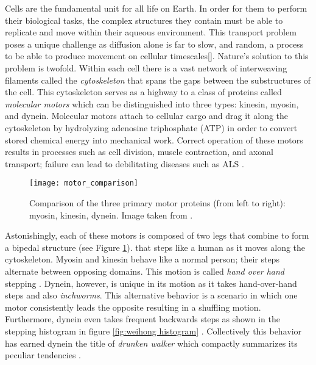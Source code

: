 Cells are the fundamental unit for all life on Earth. In order
for them to perform their biological tasks, the complex structures they contain
must be able to replicate and move within their aqueous environment. This
transport problem  poses a unique challenge as diffusion alone is far to slow,
and random, a process to be able to produce movement on cellular timescales[].
Nature's solution to this problem is twofold. Within each cell there is a vast network of interweaving filaments called the \textit{cytoskeleton} that spans the gaps between the substructures of the cell. This cytoskeleton serves as a highway to a class of proteins called \textit{molecular motors} which can be distinguished into three types: kinesin, myosin, and dynein. Molecular motors attach to cellular cargo and drag it along the cytoskeleton by hydrolyzing adenosine triphosphate (ATP) in order to convert stored chemical energy into mechanical work\cite{alberts_molecular_2002}. Correct operation of these motors results in processes such as cell division, muscle contraction, and axonal transport; failure can lead to debilitating diseases such as ALS \cite{boillee_als:_2006}. 

\begin{figure}[!hbt]
	\centering 
	\texttt{[image: motor\_comparison]}
	\caption{Comparison of the three primary motor proteins (from left to right): myosin, kinesin, dynein. Image taken from \cite{philips__nodate}.}
	\label{fig:motor proteins} 
\end{figure}

Astonishingly, each of these motors is composed of two legs that combine to form a bipedal structure (see Figure \ref{fig:motor proteins}). that steps like a human as it moves along the cytoskeleton. Myosin and kinesin behave like a normal person; their steps alternate between opposing domains. This motion is called \textit{hand over hand} stepping \cite{noauthor_drunk_nodate}. Dynein, however, is unique in its motion as it takes hand-over-hand steps and also \textit{inchworms}. This alternative behavior is a scenario in which one motor consistently leads the opposite resulting in a shuffling motion. Furthermore, dynein even takes frequent backwards steps as shown in the stepping histogram in figure \ref{fig:weihong histogram} \cite{qiu_dynein_2012}. Collectively this behavior has earned dynein the title of \textit{drunken walker} which compactly summarizes its peculiar tendencies \cite{noauthor_drunk_nodate}. \\

